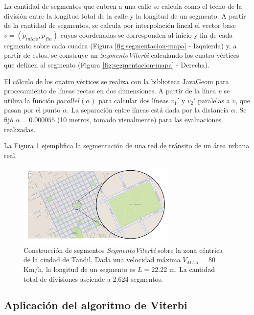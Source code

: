 La cantidad de segmentos que cubren a una calle se calcula como el techo de la división entre la longitud total de la calle y la longitud de un segmento. A partir de la cantidad de segmentos, se calcula por interpolación lineal el vector base $v = (p_{inicio},p_{fin})$ cuyas coordenadas se corresponden al inicio y fin de cada segmento sobre cada cuadra (Figura \ref{fig:segmentacion-mapa} - Izquierda) y, a partir de estos, se construye un \textit{SegmentoViterbi} calculando los cuatro vértices que definen al segmento (Figura \ref{fig:segmentacion-mapa} - Derecha).

El cálculo de los cuatro vértices se realiza con la biblioteca JavaGeom para procesamiento de líneas rectas en dos dimensiones. A partir de la línea $v$ se utiliza la función $parallel(\alpha)$ para calcular dos líneas $v_1'$ y $v_2'$ paralelas a $v$, que pasan por el punto $\alpha$. La separación entre líneas está dada por la distancia $\alpha$. Se fijó $\alpha = 0.000055$ (10 metros, tomado visualmente) para las evaluaciones realizadas.


La Figura \ref{fig:capture-segments} ejemplifica la segmentación de una red de tránsito de un área urbana real. 

\begin{figure}[!htp]
	\centering
	\includegraphics[width=0.7\textwidth]{images/capture-segments.png}
	\captionsetup{width=0.8\textwidth}
	\caption{Construcción de segmentos \textit{SegmentoViterbi} sobre la zona céntrica de la ciudad de Tandil. Dada una velocidad máxima $V_{MAX}=80$ Km/h, la longitud de un segmento es $L=22.22$ m. La cantidad total de divisiones asciende a 2.624 segmentos.}
    \label{fig:capture-segments}
\end{figure}

\subsection{Aplicación del algoritmo de Viterbi}

